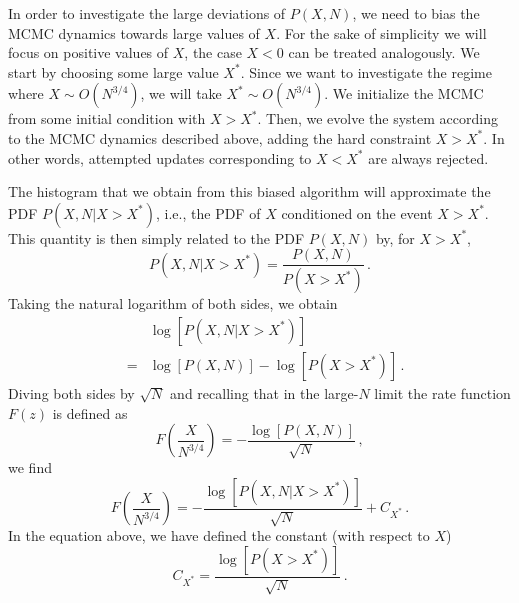 \documentclass[aps,pre,twocolumn,superscriptaddress,showpacs]{revtex4-1}
\begin{document}
In order to investigate the large deviations of $P(X,N)$, we need to
bias the MCMC dynamics towards large values of $X$. For the sake of
simplicity we will focus on positive values of $X$, the case $X<0$ can
be treated analogously. We start by choosing some large value
$X^*$. Since we want to investigate the regime where $X\sim
O(N^{3/4})$, we will take $X^*\sim O(N^{3/4})$. We initialize the MCMC
from some initial condition with $X>X^*$. Then, we evolve the system
according to the MCMC dynamics described above, adding the hard
constraint $X>X^*$. In other words, attempted updates corresponding to $X<X^*$ are always rejected.

The histogram that we obtain from this biased algorithm will approximate the PDF $P(X,N|X>X^*)$, i.e., the PDF of $X$ conditioned on the event $X>X^*$. This quantity is then simply related to the PDF $P(X,N)$ by, for $X>X^*$,
\begin{equation}
P(X,N|X>X^*)=\frac{P(X,N)}{P(X>X^*)}\,.
\end{equation}
Taking the natural logarithm of both sides, we obtain
\begin{eqnarray}
&&\log\left[P(X,N|X>X^*)\right]\nonumber \\ &=&\log\left[P(X,N)\right]-\log\left[P(X>X^*)\right]\,.
\end{eqnarray}
Diving both sides by $\sqrt{N}$ and recalling that in the large-$N$ limit the rate function $F(z)$ is defined as
\begin{equation}
F\left(\frac{X}{N^{3/4}}\right)=-\frac{\log\left[P(X,N)\right]}{\sqrt{N}}\,,
\end{equation}
we find
\begin{equation}
F\left(\frac{X}{N^{3/4}}\right)=-\frac{\log\left[P(X,N|X>X^*)\right]}{\sqrt{N}}+C_{X^*}\,.
\end{equation}
In the equation above, we have defined the constant (with respect to $X$)
\begin{equation}
C_{X^*}=\frac{\log\left[P(X>X^*)\right]}{\sqrt{N}}\,.
\end{equation}
\end{document}
